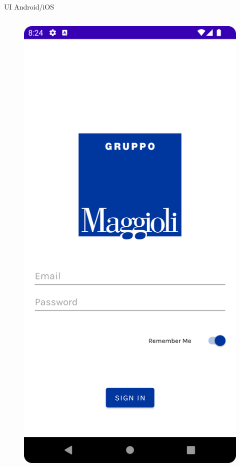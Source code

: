 \begin{frame}{UI Android/iOS}
    \begin{columns}[onlytextwidth]
        \begin{column}{0.14\textwidth}
        
            \begin{figure}[H]
                \includegraphics[width=1\textwidth]{img/login.png}
            \end{figure}
            

\end{column}
\end{columns}
\end{frame}
